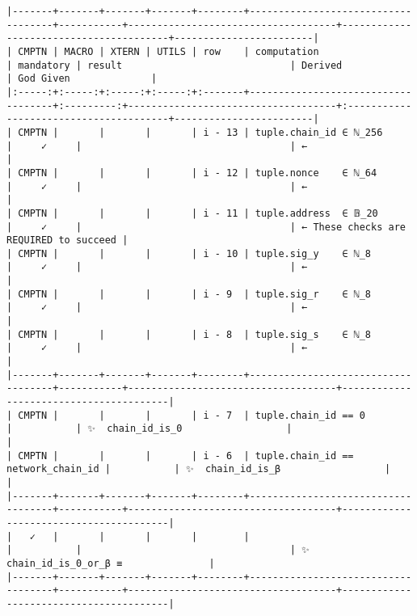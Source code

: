 \documentclass[varwidth=\maxdimen,margin=0.5cm,multi={verbatim}]{standalone}
\begin{document}
\begin{verbatim}
|-------+-------+-------+-------+--------+------------------------------------+-----------+------------------------------------+----------------------------------------+------------------------|
| CMPTN | MACRO | XTERN | UTILS | row    | computation                        | mandatory | result                             | Derived                                | God Given              |
|:-----:+:-----:+:-----:+:-----:+:-------+------------------------------------+:---------:+------------------------------------+:---------------------------------------+------------------------|
| CMPTN |       |       |       | i - 13 | tuple.chain_id ∈ ℕ_256             |     ✓     |                                    | ←                                      |
| CMPTN |       |       |       | i - 12 | tuple.nonce    ∈ ℕ_64              |     ✓     |                                    | ←                                      |
| CMPTN |       |       |       | i - 11 | tuple.address  ∈ 𝔹_20              |     ✓     |                                    | ← These checks are REQUIRED to succeed |
| CMPTN |       |       |       | i - 10 | tuple.sig_y    ∈ ℕ_8               |     ✓     |                                    | ←                                      |
| CMPTN |       |       |       | i - 9  | tuple.sig_r    ∈ ℕ_8               |     ✓     |                                    | ←                                      |
| CMPTN |       |       |       | i - 8  | tuple.sig_s    ∈ ℕ_8               |     ✓     |                                    | ←                                      |
|-------+-------+-------+-------+--------+------------------------------------+-----------+------------------------------------+----------------------------------------|
| CMPTN |       |       |       | i - 7  | tuple.chain_id == 0                |           | ✨  chain_id_is_0                  |                                        |
| CMPTN |       |       |       | i - 6  | tuple.chain_id == network_chain_id |           | ✨  chain_id_is_β                  |                                        |
|-------+-------+-------+-------+--------+------------------------------------+-----------+------------------------------------+----------------------------------------|
|   ✓   |       |       |       |        |                                    |           |                                    | ✨  chain_id_is_0_or_β ≡               |
|-------+-------+-------+-------+--------+------------------------------------+-----------+------------------------------------+----------------------------------------|

\end{verbatim}
\end{document}
